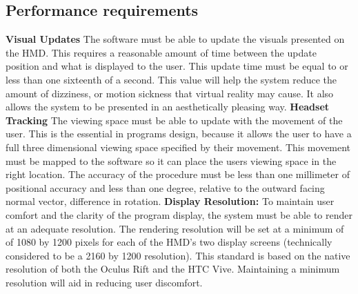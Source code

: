 \documentclass[onecolumn, draftclsnofoot,10pt, compsoc]{IEEEtran}
\begin{document}
\subsection{Performance requirements}
\textbf{Visual Updates}
\newline
The software must be able to update the visuals presented on the HMD. This requires a reasonable amount of time between the update position and what is displayed to the user. This update time must be equal to or less than one sixteenth of a second. This value will help the system reduce the amount of dizziness, or motion sickness that virtual reality may cause. It also allows the system to be presented in an aesthetically pleasing way.
\newline
\textbf{Headset Tracking}
\newline
The viewing space must be able to update with the movement of the user. This is the essential in programs design, because it allows the user to have a full three dimensional viewing space specified by their movement. This movement must be mapped to the software so it can place the users viewing space in the right location. The accuracy of the procedure must be less than one millimeter of positional accuracy and less than one degree, relative to the outward facing normal vector, difference in rotation.
\newline
\textbf{Display Resolution:}
\newline
To maintain user comfort and the clarity of the program display, the system must be able to render at an adequate resolution. The rendering resolution will be set at a minimum of of 1080 by 1200 pixels for each of the HMD’s two display screens (technically considered to be a 2160 by 1200 resolution). This standard is based on the native resolution of both the Oculus Rift and the HTC Vive. Maintaining a minimum resolution will aid in reducing user discomfort.
\end{document}

